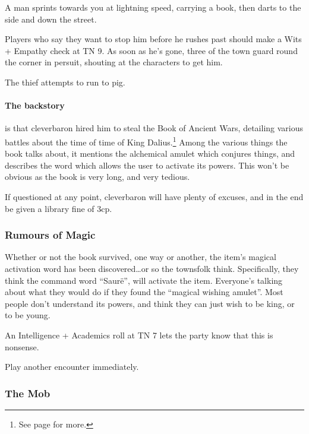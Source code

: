 \begin{boxtext}
	A man sprints towards you at lightning speed, carrying a book, then darts to the side and down the street.

\end{boxtext}

Players who say they want to stop him before he rushes past should make a Wits + Empathy check at TN 9.  As soon as he's gone, three of the town guard round the corner in persuit, shouting at the characters to get him.

The thief attempts to run to \gls{pig}.

\paragraph{The backstory} is that \gls{cleverbaron} hired him to steal the Book of Ancient Wars, detailing various battles about the time of time of King Dalius.\footnote{See page \pageref{h_dalius} for more.}  Among the various things the book talks about, it mentions the alchemical amulet which conjures things, and describes the word which allows the user to activate its powers.  This won't be obvious as the book is very long, and very tedious.

If questioned at any point, \gls{cleverbaron} will have plenty of excuses, and in the end be given a library fine of 3cp.

\subsubsection{Rumours of Magic}

Whether or not the book survived, one way or another, the item's magical activation word has been discovered\ldots or so the townsfolk think.  Specifically, they think the command word ``Saur\"{e}'', will activate the item.  Everyone's talking about what they would do if they found the ``magical wishing amulet''.  Most people don't understand its powers, and think they can just wish to be king, or to be young.

An Intelligence + Academics roll at TN 7 lets the party know that this is nonsense.

Play another encounter immediately.

\subsubsection{The Mob}

